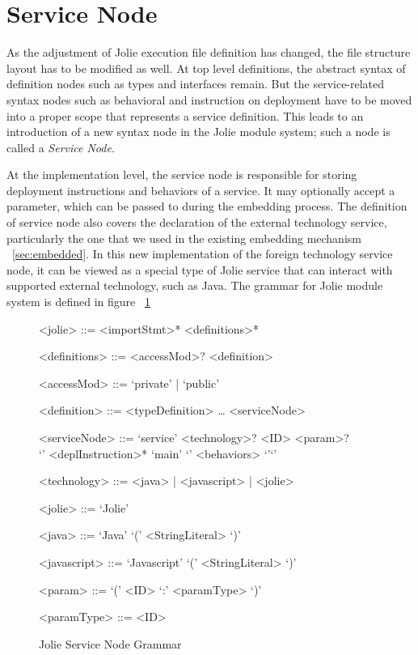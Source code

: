 \section{Service Node}

As the adjustment of Jolie execution file definition has changed, the file structure layout has to be modified as well.  At top level definitions, the abstract syntax of definition nodes such as types and interfaces remain. But the service-related syntax nodes such as behavioral and instruction on deployment have to be moved into a proper scope that represents a service definition. This leads to an introduction of a new syntax node in the Jolie module system; such a node is called a \textit{Service Node}.

At the implementation level, the service node is responsible for storing deployment instructions and behaviors of a service. It may optionally accept a parameter, which can be passed to during the embedding process.
The definition of service node also covers the declaration of the external technology service, particularly the one that we used in the existing embedding mechanism ~\ref{sec:embedded}.
In this new implementation of the foreign technology service node, it can be viewed as a special type of Jolie service that can interact with supported external technology, such as Java.
The grammar for Jolie module system is defined in figure ~\ref{fig:jolie-servicenode-grammar}

\begin{figure}[h]
    \begin{framed}
        \begin{grammar}
            <jolie> ::= <importStmt>* <definitions>*

            <definitions> ::= <accessMod>? <definition>

            <accessMod> ::= `private' | `public'

            <definition> ::=  <typeDefinition>
            \dots
            \alt <serviceNode>

            <serviceNode> ::= `service' <technology>? <ID> <param>? \\ `{' <deplInstruction>* `main' `{' <behaviors> `}'`}'

            <technology> ::= <java> | <javascript> | <jolie>

            <jolie> ::= `Jolie'

            <java> ::= `Java' `(' <StringLiteral> `)'

            <javascript> ::= `Javascript' `(' <StringLiteral> `)'

            <param> ::= `(' <ID> `:' <paramType> `)'

            <paramType> ::= <ID>
        \end{grammar}
    \end{framed}
    \caption{Jolie Service Node Grammar}
    \label{fig:jolie-servicenode-grammar}
\end{figure}

